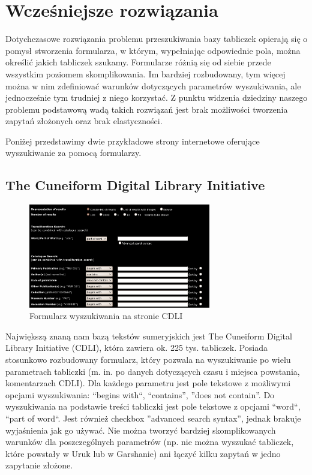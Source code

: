 \chapter{Wcześniejsze rozwiązania}\label{r:losers}


Dotychczasowe rozwiązania problemu przeszukiwania bazy tabliczek opierają się o pomysł stworzenia formularza,
w którym, wypełniając odpowiednie pola, można określić jakich tabliczek szukamy.
Formularze różnią się od siebie przede wszystkim poziomem skomplikowania.
Im bardziej rozbudowany, tym więcej można w nim zdefiniować warunków dotyczących parametrów wyszukiwania,
ale jednocześnie tym trudniej z niego korzystać.
Z punktu widzenia dziedziny naszego problemu podstawową wadą takich rozwiązań jest 
brak możliwości tworzenia zapytań złożonych oraz brak elastyczności.


Poniżej przedstawimy dwie przykładowe strony internetowe oferujące wyszukiwanie za pomocą formularzy.


\section{The Cuneiform Digital Library Initiative \cite{cdli}}
\begin{figure}[h]
 \centering
 \includegraphics[width=300px]{../diagramy/cdli-search.png}
 \caption{Formularz wyszukiwania na stronie CDLI}
 \label{fig:cdli-search}
\end{figure}
Największą znaną nam bazą tekstów sumeryjskich jest The Cuneiform Digital Library Initiative (CDLI),
która zawiera ok. 225 tys. tabliczek.
Posiada stosunkowo rozbudowany formularz, 
który pozwala na wyszukiwanie po wielu parametrach tabliczki 
(m. in. po danych dotyczących czasu i miejsca powstania, komentarzach CDLI). 
Dla każdego parametru jest pole tekstowe z możliwymi opcjami wyszukiwania:
``begins with``, ``contains'', ''does not contain''.
Do wyszukiwania na podstawie treści tabliczki jest pole tekstowe z opcjami ``word``, ``part of word``.
Jest również checkbox ''advanced search syntax'', jednak brakuje wyjaśnienia jak go używać.
Nie można tworzyć bardziej skomplikowanych warunków dla poszczególnych parametrów
(np. nie można wyszukać tabliczek, które powstały w Uruk lub w Garshanie)
ani łączyć kilku zapytań w jedno zapytanie złożone.


